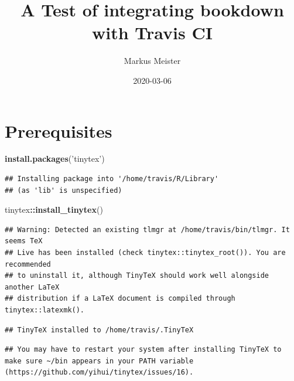 \documentclass[]{book}
\title{A Test of integrating bookdown with Travis CI}
\author{Markus Meister}
\date{2020-03-06}
\newenvironment{Shaded}{\begin{snugshade}}{\end{snugshade}}
\newcommand{\KeywordTok}[1]{\textcolor[rgb]{0.13,0.29,0.53}{\textbf{#1}}}
\newcommand{\NormalTok}[1]{#1}
\newcommand{\OperatorTok}[1]{\textcolor[rgb]{0.81,0.36,0.00}{\textbf{#1}}}
\newcommand{\StringTok}[1]{\textcolor[rgb]{0.31,0.60,0.02}{#1}}
\begin{document}
\maketitle

{
\setcounter{tocdepth}{1}
\tableofcontents
}
\hypertarget{prerequisites}{%
\chapter{Prerequisites}\label{prerequisites}}

\begin{Shaded}
\begin{Highlighting}[]
\KeywordTok{install.packages}\NormalTok{(}\StringTok{'tinytex'}\NormalTok{)}
\end{Highlighting}
\end{Shaded}

\begin{verbatim}
## Installing package into '/home/travis/R/Library'
## (as 'lib' is unspecified)
\end{verbatim}

\begin{Shaded}
\begin{Highlighting}[]
\NormalTok{tinytex}\OperatorTok{::}\KeywordTok{install_tinytex}\NormalTok{()}
\end{Highlighting}
\end{Shaded}

\begin{verbatim}
## Warning: Detected an existing tlmgr at /home/travis/bin/tlmgr. It seems TeX
## Live has been installed (check tinytex::tinytex_root()). You are recommended
## to uninstall it, although TinyTeX should work well alongside another LaTeX
## distribution if a LaTeX document is compiled through tinytex::latexmk().
\end{verbatim}

\begin{verbatim}
## TinyTeX installed to /home/travis/.TinyTeX
\end{verbatim}

\begin{verbatim}
## You may have to restart your system after installing TinyTeX to make sure ~/bin appears in your PATH variable (https://github.com/yihui/tinytex/issues/16).
\end{verbatim}
\end{document}
